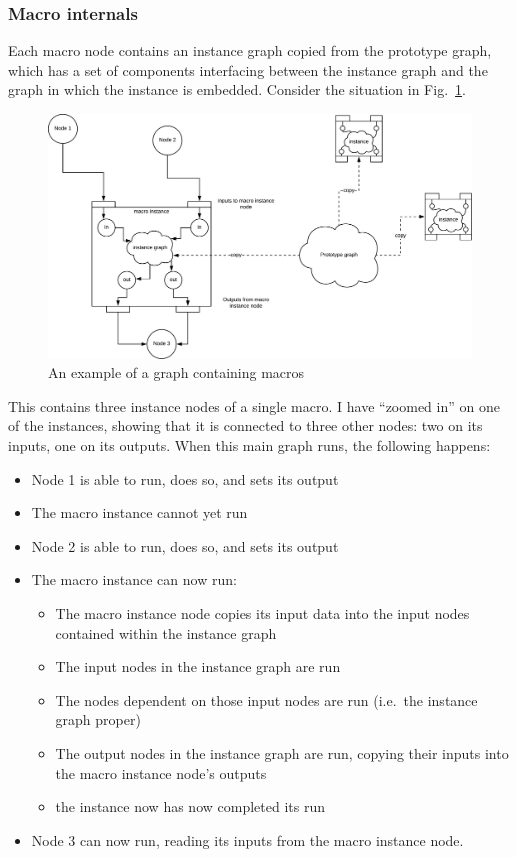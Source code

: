 \subsubsection{Macro internals}
Each macro node contains an instance graph copied from the prototype
graph, which has a set of components interfacing between the instance
graph and the graph in which the instance is embedded.
Consider the situation in Fig.~\ref{macroobjs.pdf}.
\begin{figure}[ht]
\center
\includegraphics[width=5in]{macroobjs.pdf}
\caption{An example of a graph containing macros}
\label{macroobjs.pdf}
\end{figure}
This contains three instance nodes of a single macro. 
I have ``zoomed in'' on one of the instances, showing that it is connected
to three other nodes: two on its inputs, one on its outputs.
When this main graph runs, the following happens:
\begin{itemize}
\item Node 1 is able to run, does so, and sets its output
\item The macro instance cannot yet run
\item Node 2 is able to run, does so, and sets its output
\item The macro instance can now run:
\begin{itemize}
\item The macro instance node copies its input data
into the input nodes contained within the instance graph
\item The input nodes in the instance graph are run
\item The nodes dependent on those input nodes are run (i.e.\ the
instance graph proper)
\item The output nodes in the instance graph are run, copying their
inputs into the macro instance node's outputs
\item the instance now has now completed its run
\end{itemize}
\item Node 3 can now run, reading its inputs from the macro instance node.
\end{itemize}


